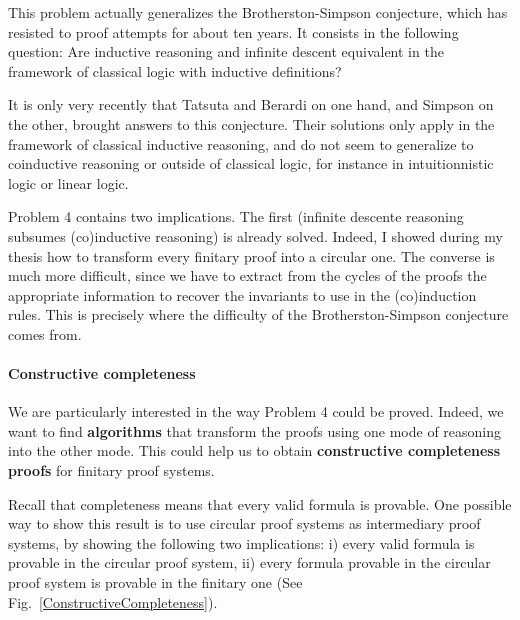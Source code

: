\documentclass[11pt,twocolumn]{article}
\begin{document}
This problem actually generalizes the Brotherston-Simpson conjecture, which has resisted to proof attempts for about ten years. It consists in the following question: Are inductive reasoning and infinite descent equivalent in the framework of classical logic with inductive definitions?


It is only very recently that Tatsuta and Berardi \cite{BerardiT17fossacs, BerardiT17lics} on one hand, and Simpson \cite{Simpson17fossacs} on the other, brought answers to this conjecture. Their solutions only apply in the framework of classical inductive reasoning, and do not seem to generalize to coinductive reasoning or outside of classical logic, for instance in intuitionnistic logic or linear logic.


\smallskip
Problem 4 contains two implications. The first (infinite descente reasoning subsumes (co)inductive reasoning) is already solved. Indeed, I showed during my thesis how to transform every finitary proof into a circular one. The converse is much more difficult, since we have to extract from the cycles of the proofs the appropriate information to recover the invariants to use in the (co)induction rules. This is precisely where the difficulty of the Brotherston-Simpson conjecture comes from.
  


\paragraph{Constructive completeness}

We are particularly interested in the way Problem 4 could be proved. 
Indeed, we want to find \textbf{algorithms} that transform the proofs using one mode of reasoning into the other mode. This could help us to obtain \textbf{constructive completeness proofs} for finitary proof systems.


Recall that completeness means that every valid formula is provable. One possible way to show this result is to use circular proof systems as intermediary proof systems, by showing the following two implications:
i) every valid formula is provable in the circular proof system, ii) every formula provable in the circular proof system is provable in the finitary one (See Fig.~\ref{ConstructiveCompleteness}).   
 
\end{document}
